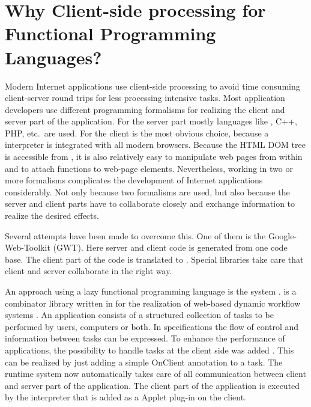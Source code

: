 \section{Why Client-side processing for Functional Programming Languages?} \label{sapljs:sec:motivation}
Modern Internet applications use client-side processing to avoid time consuming client-server round trips 
for less processing intensive tasks.
Most application developers use different programming formalisms for realizing the client and server part of the application.
For the server part mostly languages like \Java, \textsf{C++}, \textsf{PHP}, etc.\ are used.
For the client \JS is the most obvious choice, because a \JS interpreter is integrated with all modern browsers.
Because the \textsf{HTML} \textsf{DOM} tree is accessible from \JS, it is also relatively easy to manipulate web pages from within \JS and to attach \JS functions to web-page elements.
Nevertheless, working in two or more formalisms complicates the development of Internet applications considerably. 
Not only because two formalisms are used, but also because the server and client parts have to collaborate closely
and exchange information to realize the desired effects.

Several attempts have been made to overcome this. One of them is the Google-Web-Toolkit (\textsf{GWT}). 
Here server and client code is generated from one \Java code base. 
The client part of the code is translated to \JS.
Special libraries take care that client and server collaborate in the right way.

An  approach using a lazy functional programming language is the \iTask system \cite{ITASK}. 
\iTask is a combinator library written in  \Clean 
for the realization of web-based dynamic workflow systems \cite{LDTA2010}. 
An \iTask application consists of a structured collection of tasks to be performed by users, 
computers or both.
In \iTask specifications the flow of control and information between tasks can be expressed. 
To enhance the performance of \iTask applications, 
the possibility to handle tasks at the client side was added \cite{ITASK_AJAX}. 
This can be realized by just adding a simple \textsf{OnClient} annotation to a task. 
The \iTask runtime system now automatically takes care of all communication between 
client and server part of the application. The client part of the application is executed
by the \Sapl interpreter that is added as a \Java Applet plug-in on the client.

